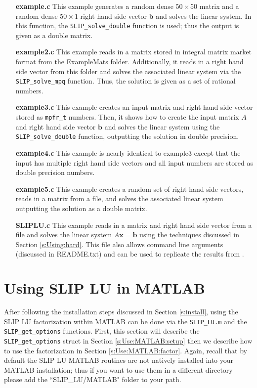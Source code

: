 \documentclass[11pt]{article}
\theoremstyle{definition}
\begin{document}
\begin{itemize}
\item [\bf example.c] This example generates a random dense $50 \times 50$ matrix and a random dense $50 \times 1$ right hand side vector $\mathbf{b}$ and solves the linear system. In this function, the \verb|SLIP_solve_double| function is used; thus the output is given as a double matrix.
\item [\bf example2.c] This example reads in a matrix stored in integral matrix market format from the ExampleMats folder. Additionally, it reads in a right hand side vector from this folder and solves the associated linear system via the \verb|SLIP_solve_mpq| function. Thus, the solution is given as a set of rational numbers.
\item [\bf example3.c] This example creates an input matrix and right hand side vector stored as \verb|mpfr_t| numbers. Then, it shows how to create the input matrix $A$ and right hand side vector $\mathbf{b}$ and solves the linear system using the \verb|SLIP_solve_double| function, outputting the solution in double precision.
\item [\bf example4.c] This example is nearly identical to example3 except that the input has multiple right hand side vectors and all input numbers are stored as double precision numbers.
\item [\bf example5.c] This example creates a random set of right hand side vectors, reads in a matrix from a file, and solves the associated linear system outputting the solution as a double matrix.
\item [\bf SLIPLU.c] This example reads in a matrix and right hand side vector from a file and solves the linear system $A \mathbf{x} = \mathbf{b}$ using the techniques discussed in Section \ref{s:Using:hard}. This file also allows command line arguments (discussed in README.txt) and can be used to replicate the results from \cite{lourenco2019exact}.
\end{itemize}

\newpage

\cprotect\section{Using SLIP LU in MATLAB} \label{s:Use:MATLAB}

After following the installation steps discussed in Section \ref{s:install}, using the SLIP LU factorization within MATLAB can be done via the \verb|SLIP_LU.m| and the \verb|SLIP_get_options| functions. First, this section will describe the \verb|SLIP_get_options| struct in Section \ref{s:Use:MATLAB:setup} then we describe how to use the factorization in Section \ref{s:Use:MATLAB:factor}. Again, recall that by default the SLIP LU MATLAB routines are not natively installed into your MATLAB installation; thus if you want to use them in a different directory please add the ``SLIP\_LU/MATLAB" folder to your path.
\end{document}
